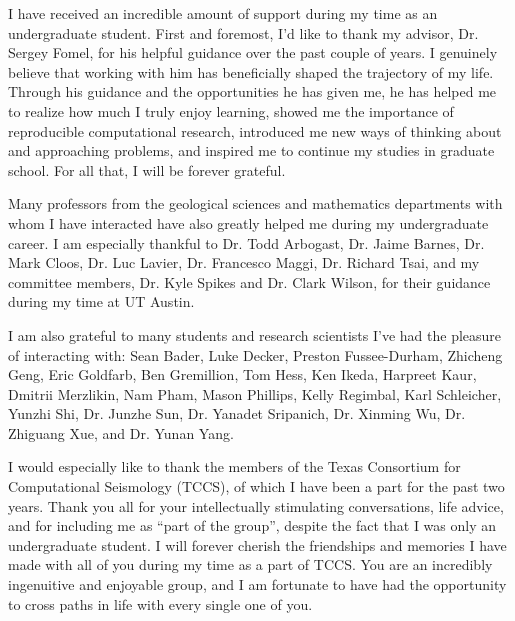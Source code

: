 I have received an incredible amount of support during my time as an undergraduate student. 
First and foremost, I'd like to thank my advisor, Dr. Sergey Fomel, for his helpful guidance over the past couple of years. 
I genuinely believe that working with him has beneficially shaped the trajectory of my life.
Through his guidance and the opportunities he has given me, he has helped me to realize how much I truly enjoy learning, showed me the importance of reproducible computational research, introduced me new ways of thinking about and approaching problems, and inspired me to continue my studies in graduate school.
For all that, I will be forever grateful.

Many professors from the geological sciences and mathematics departments with whom I have interacted have also greatly helped me during my undergraduate career.  
I am especially thankful to Dr. Todd Arbogast, Dr. Jaime Barnes, Dr. Mark Cloos, Dr. Luc Lavier, Dr. Francesco Maggi, Dr. Richard Tsai, and my committee members, Dr. Kyle Spikes and Dr. Clark Wilson, for their guidance during my time at UT Austin.

I am also grateful to many students and research scientists I've had the pleasure of interacting with: 
Sean Bader, Luke Decker, Preston Fussee-Durham, Zhicheng Geng, Eric Goldfarb, Ben Gremillion, Tom Hess, Ken Ikeda, Harpreet Kaur, Dmitrii Merzlikin, Nam Pham, Mason Phillips, Kelly Regimbal, Karl Schleicher, Yunzhi Shi, Dr. Junzhe Sun, Dr. Yanadet Sripanich, Dr. Xinming Wu, Dr. Zhiguang Xue, and Dr. Yunan Yang. 

I would especially like to thank the members of the Texas Consortium for Computational Seismology (TCCS), of which I have been a part for the past two years.
Thank you all for your intellectually stimulating conversations, life advice, and for including me as ``part of the group'', despite the fact that I was only an undergraduate student.
I will forever cherish the friendships and memories I have made with all of you during my time as a part of TCCS. %
You are an incredibly ingenuitive and enjoyable group, and I am fortunate to have had the opportunity to cross paths in life with every single one of you.

